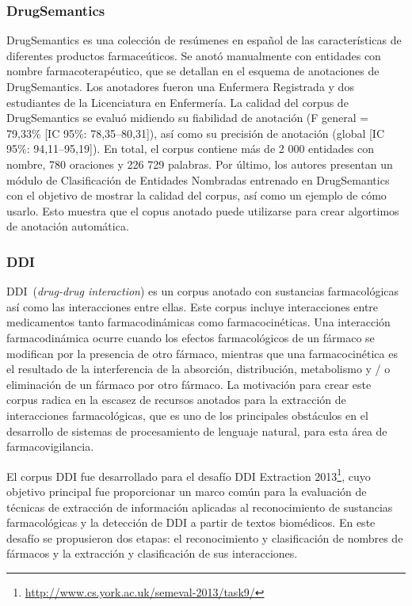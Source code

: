 \subsubsection*{DrugSemantics}

DrugSemantics es una colección de resúmenes en español de las características de diferentes productos farmaceúticos.
Se anotó manualmente con entidades con nombre farmacoterapéutico, que se detallan en el esquema de anotaciones de DrugSemantics.
Los anotadores fueron una Enfermera Registrada y dos estudiantes de la Licenciatura en Enfermería. La calidad del corpus de DrugSemantics se evaluó midiendo su fiabilidad de anotación (F general = 79,33\% [IC 95\%: 78,35–80,31]), así como su precisión de anotación (global [IC 95\%: 94,11–95,19]).
En total, el corpus contiene más de 2 000 entidades con nombre, 780 oraciones y 226 729 palabras. Por último, los autores presentan un módulo de Clasificación de Entidades Nombradas entrenado en DrugSemantics con el objetivo de mostrar la calidad del corpus, así como un ejemplo de cómo usarlo.
Esto muestra que el copus anotado puede utilizarse para crear algortimos de anotación automática.

\subsubsection*{DDI}

DDI~(\textit{drug-drug interaction}) es un corpus anotado con sustancias farmacológicas así como las interacciones entre ellas.
Este corpus incluye interacciones entre medicamentos tanto farmacodinámicas como farmacocinéticas.
Una interacción farmacodinámica ocurre cuando los efectos farmacológicos de un fármaco se modifican por la presencia de otro fármaco, mientras que una farmacocinética es el resultado de la interferencia de la absorción, distribución, metabolismo y / o eliminación de un fármaco por otro fármaco.
La motivación para crear este corpus radica en la escasez de recursos anotados para la extracción de interacciones farmacológicas, que es uno de los principales obstáculos en el desarrollo de sistemas de procesamiento de lenguaje natural, para esta área de farmacovigilancia.

El corpus DDI fue desarrollado para el desafío DDI Extraction 2013\footnote{\url{http://www.cs.york.ac.uk/semeval-2013/task9/}}, cuyo objetivo principal fue proporcionar un marco común para la evaluación de técnicas de extracción de información  aplicadas al reconocimiento de sustancias farmacológicas y la detección de DDI a partir de textos biomédicos.
En este desafío se propusieron dos etapas: el reconocimiento y clasificación de nombres de fármacos y la extracción y clasificación de sus interacciones.


